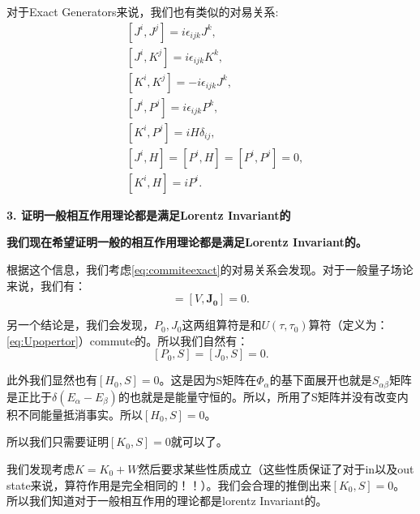 对于Exact Generators来说，我们也有类似的对易关系:
\begin{equation}
  \begin{aligned}
&[J^i,J^j]=i\epsilon_{ijk}J^k,\\
&[J^i,K^j]=i\epsilon_{ijk}K^k,\\
&[K^i,K^j]=-i\epsilon_{ijk}J^k,\\
&[J^i,P^j]=i\epsilon_{ijk}P^k,\\
&[K^i,P^j]=iH\delta_{ij},\\
&[J^i,H]=[P^i,H]=[P^i,P^j]=0,\\
&[K^i,H]=iP^i.
  \end{aligned}
  \label{eq:commiteexact}
\end{equation}

\textbf{3. 证明一般相互作用理论都是满足Lorentz Invariant的}


 \textbf{我们现在希望证明一般的相互作用理论都是满足Lorentz Invariant的。}

根据这个信息，我们考虑\cref{eq:commiteexact}的对易关系会发现。对于一般量子场论来说，我们有：
\begin{equation}
  [V,\mathbf{P_0}]=[V,\mathbf{J_0}]=0. 
  \label{eq:normalcommuteV}
\end{equation}

另一个结论是，我们会发现，$P_0,J_0$这两组算符是和$U(\tau,\tau_0)$算符（定义为：\cref{eq:Upopertor}）commute的。所以我们自然有：
\[
  [P_0,S]=[J_0,S]=0.
\]

此外我们显然也有$[H_0,S] = 0$。这是因为S矩阵在$\Phi_\alpha$的基下面展开也就是$S_{\alpha\beta}$矩阵是正比于$\delta(E_\alpha-E_\beta)$的也就是是能量守恒的。所以，所用了S矩阵并没有改变内积不同能量抵消事实。所以$[H_0,S] = 0$。

所以我们只需要证明$[K_0,S] = 0$就可以了。

我们发现考虑$ K= K_0+W $然后要求某些性质成立（这些性质保证了对于in以及out state来说，算符作用是完全相同的！！）。我们会合理的推倒出来$ [K_0,S] = 0 $。所以我们知道对于一般相互作用的理论都是lorentz Invariant的。


